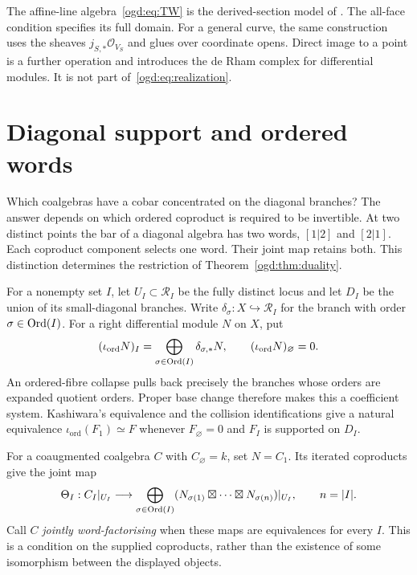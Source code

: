 The affine-line algebra~\eqref{ogd:eq:TW} is the derived-section model of .
The all-face condition specifies its full domain.
For a general curve, the same construction uses the sheaves \(j_{S,*}\mathcal O_{V_S}\) and glues over coordinate opens.
Direct image to a point is a further operation and introduces the de Rham complex for differential modules.
It is not part of~\eqref{ogd:eq:realization}.

\section{Diagonal support and ordered words}
\label{ogd:sec:recognition}

Which coalgebras have a cobar concentrated on the diagonal branches?
The answer depends on which ordered coproduct is required to be invertible.
At two distinct points the bar of a diagonal algebra has two words,
$[1|2]$ and $[2|1]$. Each coproduct component selects one word.
Their joint map retains both. This distinction determines the restriction
of Theorem~\ref{ogd:thm:duality}.

For\label{ogd:def:ordered-small-diagonal-insertion}\label{ogd:def:h373p04-ordered-diagonal-insertion}\label{ogd:def:ordered-diagonal-coefficient-system} a nonempty set $I$, let $U_I\subset\mathscr R_I$ be the fully distinct
locus and let $D_I$ be the union of its small-diagonal branches.
Write $\delta_\sigma:X\hookrightarrow\mathscr R_I$ for the branch with
order $\sigma\in\operatorname{Ord}(I)$. For a right differential module $N$ on $X$, put
\[
 (\iota_{\mathrm{ord}}N)_I
   =\bigoplus_{\sigma\in\operatorname{Ord}(I)}\delta_{\sigma,*}N,
 \qquad (\iota_{\mathrm{ord}}N)_\varnothing=0.
\]
An ordered-fibre collapse pulls back precisely the branches whose orders
are expanded quotient orders. Proper base change therefore makes this a
coefficient system. Kashiwara's equivalence and the collision identifications
give a natural equivalence $\iota_{\mathrm{ord}}(F_1)\simeq F$ whenever
$F_\varnothing=0$ and $F_I$ is supported on $D_I$.

For\label{ogd:def:coalgebra-singleton-coefficient} a coaugmented coalgebra $C$ with $C_\varnothing=k$, set $N=C_1$.
Its iterated coproducts give the joint map
\begin{equation}\label{ogd:eq:joint-recognition}
 \Theta_I:C_I|_{U_I}\longrightarrow
 \bigoplus_{\sigma\in\operatorname{Ord}(I)}
 (N_{\sigma(1)}\boxtimes\cdots\boxtimes N_{\sigma(n)})|_{U_I},
 \qquad n=|I|.
\end{equation}
Call $C$ \emph{jointly word-factorising} when these maps are equivalences
for every $I$. This is a condition on the supplied coproducts, rather than
the existence of some isomorphism between the displayed objects.

